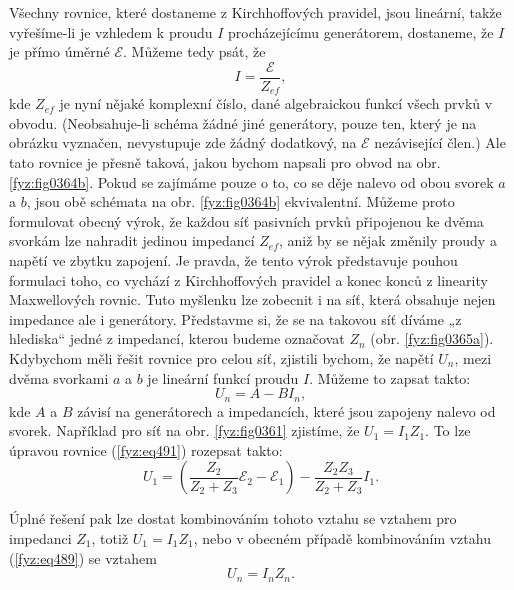   Všechny rovnice, které dostaneme z Kirchhoffových pravidel, jsou lineární, takže vyřešíme-li je 
  vzhledem k proudu \(I\) procházejícímu generátorem, dostaneme, že \(I\) je přímo úměrné 
  \(\mathscr{E}\). Můžeme tedy psát, že
  \begin{equation*}
    I = \frac{\mathscr{E}}{Z_{ef}},
  \end{equation*}
  kde \(Z_{ef}\) je nyní nějaké komplexní číslo, dané algebraickou funkcí všech prvků v obvodu. 
  (Neobsahuje-li schéma žádné jiné generátory, pouze ten, který je na obrázku vyznačen, nevystupuje 
  zde žádný dodatkový, na \(\mathscr{E}\) nezávisející člen.) Ale tato rovnice je přesně taková, 
  jakou bychom napsali pro obvod na obr. \ref{fyz:fig0364b}. Pokud se zajímáme pouze o to, co se 
  děje nalevo od obou svorek \(a\) a \(b\), jsou obě schémata na obr. \ref{fyz:fig0364b} 
  ekvivalentní. Můžeme proto formulovat obecný výrok, že každou síť pasivních prvků připojenou ke 
  dvěma svorkám lze nahradit jedinou impedancí \(Z_{ef}\), aniž by se nějak změnily proudy a napětí 
  ve zbytku zapojení. Je pravda, že tento výrok představuje pouhou formulaci toho, co vychází z 
  Kirchhoffových pravidel a konec konců z linearity Maxwellových rovnic. Tuto myšlenku lze zobecnit 
  i na síť, která obsahuje nejen impedance ale i generátory. Představme si, že se na takovou síť 
  díváme „z hlediska“ jedné z impedancí, kterou budeme označovat \(Z_n\) (obr. \ref{fyz:fig0365a}). 
  Kdybychom měli řešit rovnice pro celou síť, zjistili bychom, že napětí \(U_n\), mezi dvěma 
  svorkami \(a\) a \(b\) je lineární funkcí proudu \(I\). Můžeme to zapsat takto:
  \begin{equation}\label{fyz:eq489}
    U_n = A - BI_n,
  \end{equation}
  kde \(A\) a \(B\) závisí na generátorech a impedancích, které jsou zapojeny nalevo od svorek. 
  Například pro síť na obr. \ref{fyz:fig0361} zjistíme, že \(U_1 = I_1Z_1\). To lze úpravou rovnice 
  (\ref{fyz:eq491}) rozepsat takto: 
  \begin{equation}\label{fyz:eq490}
    U_1 = \left(\frac{Z_2}{Z_2 + Z_3}\mathscr{E_2} - \mathscr{E_1}\right) 
         -\frac{Z_2Z_3}{Z_2 + Z_3}I_1.
  \end{equation}
  
  Úplné řešení pak lze dostat kombinováním tohoto vztahu se vztahem pro impedanci \(Z_1\), totiž 
  \(U_1 = I_1Z_1\), nebo v obecném případě kombinováním vztahu (\ref{fyz:eq489}) se vztahem
  \begin{equation*}
    U_n = I_nZ_n.
  \end{equation*}
  
